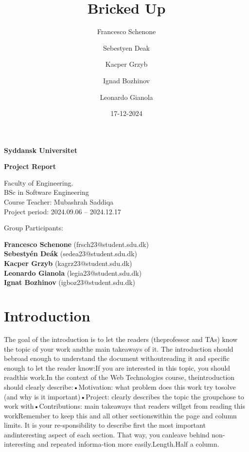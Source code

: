 \documentclass[12pt]{report}
\title{Bricked Up}
\author{Francesco Schenone \and Sebestyen Deak \and Kacper Grzyb \and Ignad Bozhinov \and Leonardo Gianola}
\date{17-12-2024}
\begin{document}
\begin{titlepage}
    \centering
    \vspace*{1cm}
    
    \Huge
    \textbf{Syddansk Universitet}
    
    \vspace{2cm}
    
    \Huge
    \textbf{Project Report}
    
    \vfill
    
    \large
    Faculty of Engineering.\\
    BSc in Software Engineering\\
    Course Teacher: Mubashrah Saddiqa\\
    Project period: 2024.09.06 -- 2024.12.17
    
    \vfill
    \begin{flushleft}  
      Group Participants: \\
    \end{flushleft}
      \hfill \small{\textbf{Francesco Schenone} (frsch23@student.sdu.dk)} \\
      \hfill \small{\textbf{Sebestyén Deák} (sedea23@student.sdu.dk)} \\
      \hfill \small{\textbf{Kacper Grzyb} (kagrz23@student.sdu.dk)} \\
      \hfill \small{\textbf{Leonardo Gianola} (legia23@student.sdu.dk)} \\
      \hfill \small{\textbf{Ignat Bozhinov} (igboz23@student.sdu.dk)} \\
  
  \end{titlepage}

\chapter{Introduction}
The goal of the introduction is to let the readers (theprofessor and TAs) know the topic of your work andthe main takeaways of it.  The introduction should bebroad enough to understand the document withoutreading it and specific enough to let the reader know:If you are interested in this topic, you should readthis work.In the context of the Web Technologies course, theintroduction should clearly describe:•Motivation:  what problem does this work try tosolve (and why is it important)•Project:   clearly  describes  the  topic  the  groupchose to work with•Contributions:  main takeaways that readers willget from reading this workRemember  to  keep  this  and  all  other  sectionswithin  the  page  and  column  limits.   It  is  your  re-sponsibility to describe first the most important andinteresting aspect of each section.  That way, you canleave  behind  non-interesting  and  repeated  informa-tion more easily.Length.Half a column.
\end{document}
